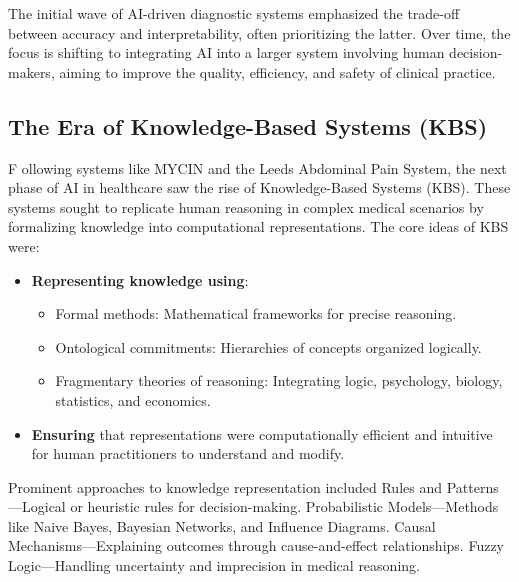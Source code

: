 \noindent The initial wave of AI-driven diagnostic systems emphasized the trade-off between accuracy and interpretability, often prioritizing the latter. Over time, the focus is shifting to integrating AI into a larger system involving human decision-makers, aiming to improve the quality, efficiency, and safety of clinical practice.

\subsection{The Era of Knowledge-Based Systems (KBS)}
\lettrine{F}{ }ollowing systems like MYCIN and the Leeds Abdominal Pain System, the next phase of AI in healthcare saw the rise of Knowledge-Based Systems (KBS). These systems sought to replicate human reasoning in complex medical scenarios by formalizing knowledge into computational representations. The core ideas of KBS were:
\begin{itemize}
    \item \textcolor{TUMRed}{\textbf{Representing knowledge using}}:
    \begin{itemize}
        \item Formal methods: Mathematical frameworks for precise reasoning.
        \item Ontological commitments: Hierarchies of concepts organized logically.
        \item Fragmentary theories of reasoning: Integrating logic, psychology, biology, statistics, and economics.
    \end{itemize}
    \item \textcolor{TUMRed}{\textbf{Ensuring}} that representations were computationally efficient and intuitive for human practitioners to understand and modify.
\end{itemize}

\noindent Prominent approaches to knowledge representation included Rules and Patterns---Logical or heuristic rules for decision-making. Probabilistic Models---Methods like Naive Bayes, Bayesian Networks, and Influence Diagrams. Causal Mechanisms---Explaining outcomes through cause-and-effect relationships. Fuzzy Logic---Handling uncertainty and imprecision in medical reasoning.\\[\baselineskip]

